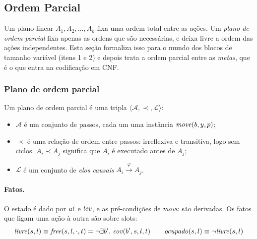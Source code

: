 \subsection{Ordem Parcial}

Um plano linear $A_1,A_2,\dots,A_k$ fixa uma ordem total entre as ações. Um \emph{plano de ordem parcial} fixa apenas as ordens que são necessárias, e deixa livre a ordem das ações independentes. Esta seção formaliza isso para o mundo dos blocos de tamanho variável (itens 1 e 2) e depois trata a ordem parcial entre as \emph{metas}, que é o que entra na codificação em CNF.

\subsubsection{Plano de ordem parcial}

Um plano de ordem parcial é uma tripla $\langle \mathcal{A},\prec,\mathcal{L}\rangle$:
\begin{itemize}
\item $\mathcal{A}$ é um conjunto de passos, cada um uma instância $\mathit{move}(b,y,p)$;
\item $\prec$ é uma relação de ordem entre passos: irreflexiva e transitiva, logo sem ciclos. $A_i\prec A_j$ significa que $A_i$ é executado antes de $A_j$;
\item $\mathcal{L}$ é um conjunto de \emph{elos causais} $A_i\xrightarrow{\varphi}A_j$.
\end{itemize}

\paragraph{Fatos.} O estado é dado por $\mathit{at}$ e $\mathit{lev}$, e as pré-condições de $\mathit{move}$ são derivadas. Os fatos que ligam uma ação à outra são sobre slots:
\[
\mathit{livre}(s,l)\equiv\mathit{free}(s,l,\cdot,t)=\neg\exists b'.\ \mathit{cov}(b',s,l,t)\qquad
\mathit{ocupado}(s,l)\equiv\neg\mathit{livre}(s,l)
\]

